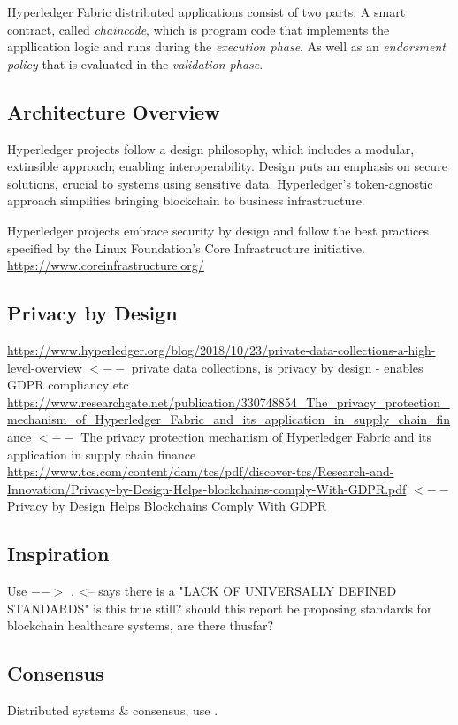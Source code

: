 \documentclass{report}
\begin{document}
\begin{flushleft}
Hyperledger Fabric distributed applications consist of two parts: A smart contract, called \emph{chaincode}, which is program code that implements the appllication logic and runs during the \emph{execution phase}.
As well as an \emph{endorsment policy} that is evaluated in the \emph{validation phase}.

\subsection{Architecture Overview}
Hyperledger projects follow a design philosophy, which includes a modular, extinsible approach; enabling interoperability.
Design puts an emphasis on secure solutions, crucial to systems using sensitive data.
Hyperledger's token-agnostic approach simplifies bringing blockchain to business infrastructure. \cite{noauthor_hyperledger_2017}

Hyperledger projects embrace security by design and follow the best practices specified by the Linux Foundation's Core Infrastructure initiative. \url{https://www.coreinfrastructure.org/}

\subsection{Privacy by Design}

\url{https://www.hyperledger.org/blog/2018/10/23/private-data-collections-a-high-level-overview} $<--$ private data collections, is privacy by design - enables GDPR compliancy etc 
\url{https://www.researchgate.net/publication/330748854_The_privacy_protection_mechanism_of_Hyperledger_Fabric_and_its_application_in_supply_chain_finance} $<--$ The privacy protection mechanism of Hyperledger Fabric and its application in supply chain finance
\url{https://www.tcs.com/content/dam/tcs/pdf/discover-tcs/Research-and-Innovation/Privacy-by-Design-Helps-blockchains-comply-With-GDPR.pdf} $<--$ Privacy by Design Helps Blockchains Comply With GDPR

\subsection{Inspiration} %
Use $-->$ \cite{yuan_design_2018}. <-- says there is a "LACK OF UNIVERSALLY DEFINED STANDARDS" is this true still? should this report be proposing standards for blockchain healthcare systems, are there thusfar?

\subsection{Consensus}
Distributed systems \& consensus, use \cite{lamport_byzantine_1982}. \linebreak[1]


\end{flushleft}
\end{document}
